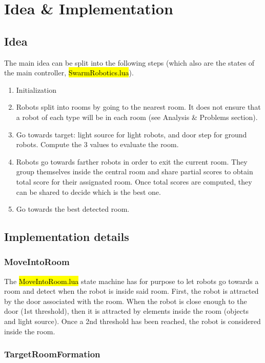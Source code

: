 \section{Idea \& Implementation}

\subsection{Idea}

\noindent The main idea can be split into the following steps (which also are
the states of the main controller, \hl{SwarmRobotics.lua}).

\begin{enumerate}
    \item Initialization
    \item Robots split into rooms by going to the nearest room. It does not
    ensure that a robot of each type will be in each room (see Analysis \&
    Problems section).
    \item Go towards target: light source for light robots, and door step for
    ground robots. Compute the 3 values to evaluate the room.
    \item Robots go towards farther robots in order to exit the current room.
    They group themselves inside the central room and share partial scores to
    obtain total score for their assignated room. Once total scores are computed,
    they can be shared to decide which is the best one.
    \item Go towards the best detected room.
\end{enumerate}

\subsection{Implementation details}

\subsubsection{MoveIntoRoom}

The \hl{MoveIntoRoom.lua} state machine has for purpose to let robots go towards
a room and detect when the robot is inside said room. First, the robot is
attracted by the door associated with the room. When the robot is close enough
to the door (1st threshold), then it is attracted by elements inside the room
(objects and light source). Once a 2nd threshold has been reached, the robot is
considered inside the room.

\subsubsection{TargetRoomFormation}

